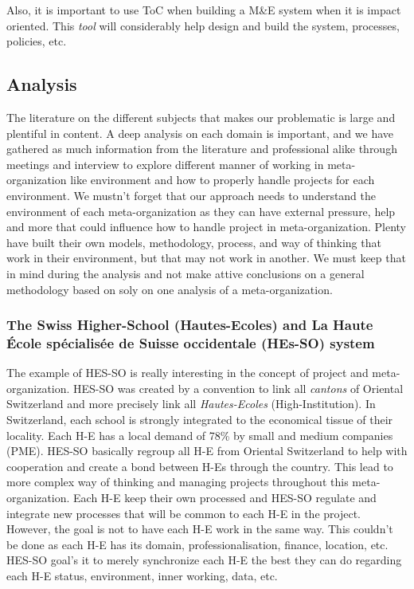 \documentclass[conference]{IEEEtran}
\begin{document}
Also, it is important to use ToC when building a M\&E system when it is impact oriented. This \textit{tool} will considerably help design and build the system, processes, policies, etc.\cite{hearn_when_2016}

\subsection{Analysis}
The literature on the different subjects that makes our problematic is large and plentiful in content. A deep analysis on each domain is important, and we have gathered as much information from the literature and professional alike through meetings and interview to explore different manner of working in meta-organization like environment and how to properly handle projects for each environment. We mustn't forget that our approach needs to understand the environment of each meta-organization as they can have external pressure, help and more that could influence how to handle project in meta-organization. Plenty have built their own models, methodology, process, and way of thinking that work in their environment, but that may not work in another. We must keep that in mind during the analysis and not make attive conclusions on a general methodology based on soly on one analysis of a meta-organization.
\subsubsection{The Swiss Higher-School (Hautes-Ecoles) and La Haute École spécialisée de Suisse occidentale (HEs-SO) system}
The example of HES-SO is really interesting in the concept of project and meta-organization. HES-SO was created by a convention to link all \textit{cantons} of Oriental Switzerland and more precisely link all \textit{Hautes-Ecoles} (High-Institution). In Switzerland, each school is strongly  integrated to the economical tissue of their locality. Each H-E has a local demand of 78\% by small and medium companies (PME).
HES-SO basically regroup all H-E from Oriental Switzerland to help with cooperation and create a bond between H-Es through the country. This lead to more complex way of thinking and managing projects throughout this meta-organization. Each H-E keep their own processed and HES-SO regulate and integrate new processes that will be common to each H-E in the project. However, the goal is not to have each H-E work in the same way. This couldn't be done as each H-E has its domain, professionalisation, finance, location, etc. HES-SO goal's it to merely synchronize each H-E the best they can do regarding each H-E status, environment, inner working, data, etc.
\end{document}
